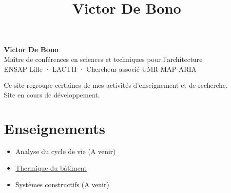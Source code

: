 \documentclass[11pt,a4paper]{article}
\title{Victor De Bono}
\begin{document}
\begin{center}
  {\LARGE\textbf{Victor De Bono}}\\[0.6em]
  Maître de conférences en sciences et techniques pour l'architecture\\
  ENSAP Lille · LACTH · Chercheur associé UMR MAP-ARIA
\end{center}

Ce site regroupe certaines de mes activités d'enseignement et de recherche.\\
Site en cours de développement.
\section*{Enseignements}

\begin{itemize}
\item Analyse du cycle de vie (A venir)
\item \href{/thermique/}{Thermique du bâtiment}
\item Systèmes constructifs (A venir)
\end{itemize}
\end{document}
